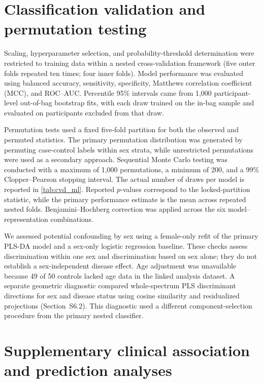 \documentclass[preprint,12pt]{elsarticle}
\begin{document}
\section{Classification validation and permutation testing}

Scaling, hyperparameter selection, and probability-threshold determination were restricted to training data within a nested cross-validation framework (five outer folds repeated ten times; four inner folds). Model performance was evaluated using balanced accuracy, sensitivity, specificity, Matthews correlation coefficient (MCC), and ROC--AUC. Percentile 95\% intervals came from 1,000 participant-level out-of-bag bootstrap fits, with each draw trained on the in-bag sample and evaluated on participants excluded from that draw.

Permutation tests used a fixed five-fold partition for both the observed and permuted statistics. The primary permutation distribution was generated by permuting case-control labels within sex strata, while unrestricted permutations were used as a secondary approach. Sequential Monte Carlo testing \cite{besag1991} was conducted with a maximum of 1,000 permutations, a minimum of 200, and a 99\% Clopper--Pearson stopping interval. The actual number of draws per model is reported in \cref{tab:cvd_ml}. Reported $p$-values correspond to the locked-partition statistic, while the primary performance estimate is the mean across repeated nested folds. Benjamini--Hochberg correction was applied across the six model--representation combinations.

We assessed potential confounding by sex using a female-only refit of the primary PLS-DA model and a sex-only logistic regression baseline. These checks assess discrimination within one sex and discrimination based on sex alone; they do not establish a sex-independent disease effect. Age adjustment was unavailable because 49 of 50 controls lacked age data in the linked analysis dataset. A separate geometric diagnostic compared whole-spectrum PLS discriminant directions for sex and disease status using cosine similarity and residualized projections (Section~S6.2). This diagnostic used a different component-selection procedure from the primary nested classifier.


\section{Supplementary clinical association and prediction analyses}
\end{document}
